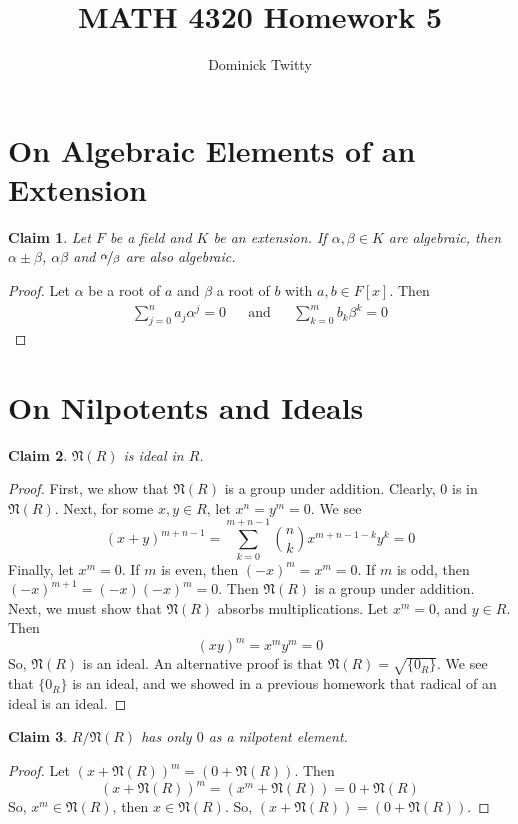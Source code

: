 \documentclass[12pt]{article}
\newtheorem*{claim*}{Claim}
\newcommand*{\nil}{\mathfrak{N}}
\begin{document}
\title{MATH 4320 Homework 5}
\author{Dominick Twitty}
\date{}
\maketitle

\section{On Algebraic Elements of an Extension}
\begin{claim*}
Let $F$ be a field and $K$ be an extension. If $\alpha, \beta \in K$ are algebraic, then $\alpha \pm \beta$, $\alpha \beta$ and $\nicefrac{\alpha}{\beta}$ are also algebraic.
\end{claim*}
\begin{proof}
Let $\alpha$ be a root of $a$ and $\beta$ a root of $b$ with $a, b \in F[x]$. Then
\begin{align*}
\sum_{j = 0}^n a _ j \alpha ^ j = 0 && \text{and} && \sum_{k = 0}^m b _ k \beta ^ k = 0
\end{align*}


\noindent 
\end{proof}



\section{On Nilpotents and Ideals}
\begin{claim*}
$\nil(R)$ is ideal in $R$.
\end{claim*}
\begin{proof}
First, we show that $\nil(R)$ is a group under addition. Clearly, $0$ is in $\nil(R)$. Next, for some $x,y \in R$, let $x^n = y^m = 0$. We see
\[ (x + y) ^ {m + n - 1} = \sum_{k = 0}^{m + n - 1} \binom{n}{k} x^{m + n - 1 - k} y^k = 0\]
Finally, let $x ^ m = 0$. If $m$ is even, then $(-x) ^ m = x ^ m = 0$. If $m$ is odd, then $(-x) ^ {m + 1} = (-x)(-x)^m = 0$. Then $\nil(R)$ is a group under addition. Next, we must show that $\nil(R)$ absorbs multiplications. Let $x^m = 0$, and $y \in R$. Then
\[ (xy) ^ m = x^m y^m = 0 \]
So, $\nil(R)$ is an ideal. An alternative proof is that $\nil(R) = \sqrt{\{0_R\}}$. We see that $\{0_R\}$ is an ideal, and we showed in a previous homework that radical of an ideal is an ideal.
\end{proof}

\begin{claim*}
$R/\nil(R)$ has only $0$ as a nilpotent element.
\end{claim*}
\begin{proof}
Let $(x + \nil(R)) ^ m = (0 + \nil(R))$. Then 
\[(x + \nil(R))^m = (x ^ m + \nil(R)) = 0 + \nil(R)\]
So, $x^m \in \nil(R)$, then $x \in \nil(R)$. So, $(x + \nil(R)) = (0 + \nil(R))$. 
\end{proof}
\end{document}
